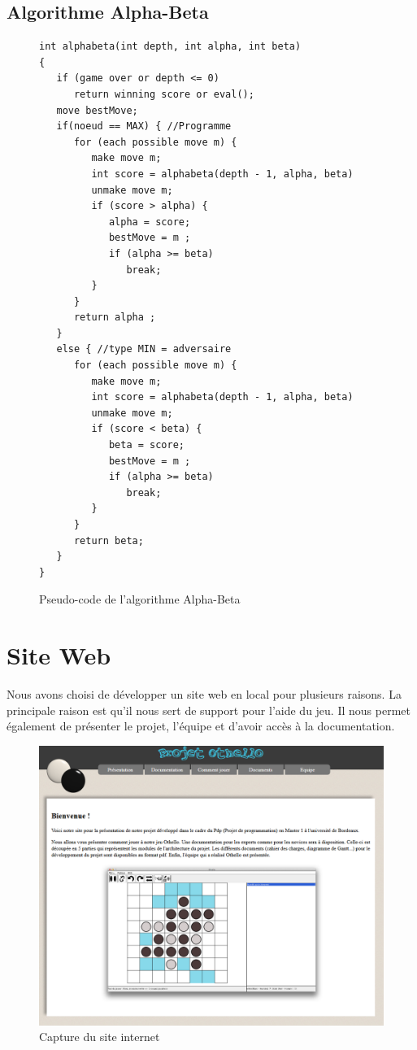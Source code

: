 \documentclass[a4paper,12pt]{report}
\begin{document}
\lstset{language=C++,basicstyle=\ttfamily\footnotesize}     
\section{Algorithme Alpha-Beta}
\begin{figure}[H]
\begin{lstlisting}[frame=single]
int alphabeta(int depth, int alpha, int beta)
{
   if (game over or depth <= 0)
      return winning score or eval();
   move bestMove;
   if(noeud == MAX) { //Programme
      for (each possible move m) {
         make move m;
         int score = alphabeta(depth - 1, alpha, beta)
         unmake move m;
         if (score > alpha) {
            alpha = score;
            bestMove = m ;
            if (alpha >= beta)
               break;
         }
      }
      return alpha ;
   } 
   else { //type MIN = adversaire
      for (each possible move m) {
         make move m;
         int score = alphabeta(depth - 1, alpha, beta)
         unmake move m;
         if (score < beta) {
            beta = score;
            bestMove = m ;
            if (alpha >= beta)
               break;
         }
      }
      return beta;
   }
}
\end{lstlisting}
\caption{Pseudo-code de l'algorithme Alpha-Beta \cite{1}}
\label{codealpha}
\end{figure}

\chapter{Site Web}

Nous avons choisi de développer un site web en local pour plusieurs raisons. La principale raison est qu’il nous sert de support pour l’aide du jeu. Il nous permet également de présenter le projet, l’équipe et d’avoir accès à la documentation.

\begin{figure}[H]
\centering
\includegraphics[scale=0.39]{Images/capture_site.png}
\caption{Capture du site internet}
\label{site}
\end{figure}
\end{document}
